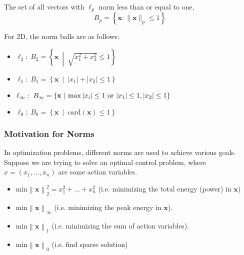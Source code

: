     \begin{definition}
        The set of all vectors with $\ell_p$ norm less than or equal to one, 
        \begin{equation}
            B_p = \left\{ \mathbf{x}: \| \mathbf{x} \|_p \leq 1 \right\}
        \end{equation}
    \end{definition}

    \begin{example} For 2D, the norm balls are as follows: 
        \begin{itemize}
            \item \( \ell_2: \; B_2 = \left\{ \mathbf{x} \ \middle| \ \sqrt{x_1^2 + x_2^2} \leq 1 \right\} \)
            \item \( \ell_1: \; B_1 = \left\{ \mathbf{x} \ \middle| \ |x_1| + |x_2| \leq 1 \right\} \)
            \item \( \ell_\infty: \; B_\infty = \left\{ \mathbf{x} \ \middle| \ \max |x_i| \leq 1 \text{ or } \abs{x_1} \leq 1, \abs{x_2} \leq 1\right\} \)
            \item \( \ell_0: \; B_0 = \left\{ \mathbf{x} \ \middle| \ \text{card}(\mathbf{x}) \leq 1 \right\} \)
        \end{itemize}

    \end{example}

    \subsubsection{Motivation for Norms}
    \begin{example}
        In optimization problems, different norms are used to achieve various goals. Suppose we are trying to solve an optimal control problem, where $x=(x_1,\ldots,x_n)$ are some action variables.
        \begin{itemize}
            \item $\text{min} \left\lVert \mathbf{x} \right\rVert_2^2 = x_1^2 + \ldots + x_n^2$ (i.e. minimizing the total energy (power) in $\mathbf{x}$)
            \item $\text{min} \left\lVert \mathbf{x} \right\rVert_\infty$ (i.e. minimizing the peak energy in $\mathbf{x}$).
            \item $\text{min} \left\lVert \mathbf{x} \right\rVert_1$ (i.e. minimizing the sum of action variables).
            \item $\text{min} \left\lVert \mathbf{x} \right\rVert_0$ (i.e. find sparse solution)
        \end{itemize}
    \end{example}

